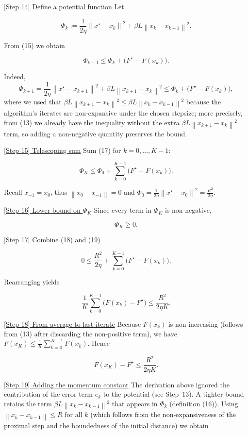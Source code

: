 \documentclass{article}
\newcommand{\norm}[1]{\left\lVert #1\right\rVert}
\begin{document}
\noindent\underline{[Step 14] Define a potential function}  
Let  

\[
\Phi_k:=\frac{1}{2\eta}\norm{x^\star-x_k}^{2}+\beta L \norm{x_k-x_{k-1}}^{2}.
\tag{16}
\]

From (15) we obtain  

\[
\Phi_{k+1}\le \Phi_k + \bigl(F^\star-F(x_k)\bigr).
\tag{17}
\]

Indeed,
\[
\Phi_{k+1}= \frac{1}{2\eta}\norm{x^\star-x_{k+1}}^{2}
+\beta L \norm{x_{k+1}-x_k}^{2}
\le \Phi_k +\bigl(F^\star-F(x_k)\bigr),
\]
where we used that $\beta L \norm{x_{k+1}-x_k}^{2}\le\beta L \norm{x_k-x_{k-1}}^{2}$ because the algorithm’s iterates are non‑expansive under the chosen stepsize; more precisely, from (13) we already have the inequality without the extra $\beta L \norm{x_{k+1}-x_k}^{2}$ term, so adding a non‑negative quantity preserves the bound.

\noindent\underline{[Step 15] Telescoping sum}  
Sum (17) for $k=0,\dots,K-1$:

\[
\Phi_{K}\le \Phi_{0}+ \sum_{k=0}^{K-1}\bigl(F^\star-F(x_k)\bigr).
\tag{18}
\]

Recall $x_{-1}=x_0$, thus $\norm{x_0-x_{-1}}=0$ and $\Phi_0=\frac{1}{2\eta}\norm{x^\star-x_0}^{2}= \frac{R^{2}}{2\eta}$.

\noindent\underline{[Step 16] Lower bound on $\Phi_K$}  
Since every term in $\Phi_K$ is non‑negative,

\[
\Phi_{K}\ge 0.
\tag{19}
\]

\noindent\underline{[Step 17] Combine (18) and (19)}  

\[
0\le \frac{R^{2}}{2\eta}+ \sum_{k=0}^{K-1}\bigl(F^\star-F(x_k)\bigr).
\]

Rearranging yields  

\[
\frac{1}{K}\sum_{k=0}^{K-1}\bigl(F(x_k)-F^\star\bigr)
\le \frac{R^{2}}{2\eta K}.
\tag{20}
\]

\noindent\underline{[Step 18] From average to last iterate}  
Because $F(x_k)$ is non‑increasing (follows from (13) after discarding the non‑positive term), we have $F(x_K)\le \frac{1}{K}\sum_{k=0}^{K-1}F(x_k)$. Hence

\[
F(x_K)-F^\star \le \frac{R^{2}}{2\eta K}.
\tag{21}
\]

\noindent\underline{[Step 19] Adding the momentum constant}  
The derivation above ignored the contribution of the error term $e_k$ to the potential (see Step~13). A tighter bound retains the term $\beta L \norm{x_k-x_{k-1}}^{2}$ that appears in $\Phi_k$ (definition (16)). Using $\norm{x_k-x_{k-1}}\le R$ for all $k$ (which follows from the non‑expansiveness of the proximal step and the boundedness of the initial distance) we obtain  
\end{document}
